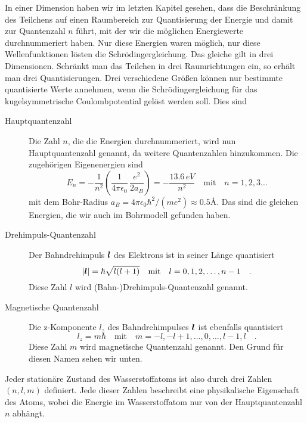 In einer Dimension haben wir im letzten Kapitel gesehen, dass die Beschränkung des Teilchens auf einen Raumbereich zur Quantisierung der Energie und damit zur Quantenzahl $n$ führt, mit der wir die möglichen Energiewerte durchnummeriert haben. Nur diese Energien waren möglich, nur diese Wellenfunktionen lösten die Schrödingergleichung. Das gleiche gilt in drei Dimensionen. Schränkt man das Teilchen in drei Raumrichtungen ein, so erhält man drei Quantisierungen. Drei verschiedene Größen können nur bestimmte quantisierte Werte annehmen, wenn die Schrödingergleichung für das kugelsymmetrische Coulombpotential gelöst werden soll. Dies sind
\begin{description}
    \item[Hauptquantenzahl] Die Zahl $n$, die die Energien durchnummeriert, wird nun Hauptquantenzahl genannt, da weitere Quantenzahlen hinzukommen. Die zugehörigen Eigenenergien sind
 \begin{equation}
E_n = - \frac{1}{n^2} \left( \frac{1}{4 \pi \epsilon_0} \, \frac{e^2}{2 a_B }\right) = - \frac{13.6 \, eV}{n^2} \quad \text{mit} \quad n = 1,2, 3 \dots        \label{eq:5_En_Bohr}
    \end{equation}
    mit dem Bohr-Radius $a_B = 4 \pi \epsilon_0 \hbar^2 / (m e^2) \approx 0.5$\AA. Das sind die gleichen Energien, die wir auch im Bohrmodell gefunden haben.

    \item[Drehimpuls-Quantenzahl] Der Bahndrehimpuls $\boldsymbol{l}$ des Elektrons ist in seiner Länge  quantisiert
    \begin{equation}
        | \boldsymbol{l} | = \hbar \sqrt{l (l+1) }  \quad \text{mit} \quad l = 0, 1,2, \dots , n-1 \quad .
    \end{equation}
Diese Zahl $l$ wird (Bahn-)Drehimpuls-Quantenzahl genannt.

\item[Magnetische Quantenzahl] Die z-Komponente $l_z$ des Bahndrehimpulses $\boldsymbol{l}$ ist ebenfalls quantisiert 
\begin{equation}
    l_z = m \hbar   \quad \text{mit} \quad m = -l, -l+1, \dots, 0, \dots, l-1, l \quad .
\end{equation}
Diese Zahl $m$ wird magnetische Quantenzahl genannt. Den Grund für diesen Namen sehen wir unten.

\end{description}
Jeder stationäre Zustand des Wasserstoffatoms ist also durch drei Zahlen $(n,l,m)$ definiert. Jede dieser Zahlen beschreibt eine physikalische Eigenschaft des Atoms, wobei die Energie im Wasserstoffatom nur von der Hauptquantenzahl $n$ abhängt.

